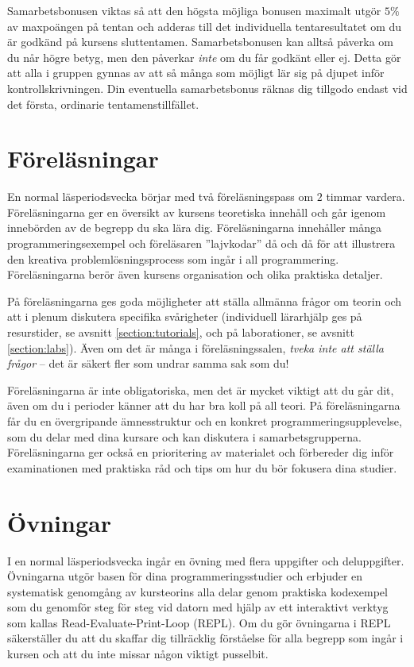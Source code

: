 Samarbetsbonusen viktas så att den högsta möjliga bonusen maximalt utgör $5\%$ av maxpoängen på tentan och adderas till det individuella tentaresultatet om du är godkänd på kursens sluttentamen. Samarbetsbonusen kan alltså påverka om du når högre betyg, men den påverkar \emph{inte} om du får godkänt eller ej. Detta gör att alla i gruppen gynnas av att så många som möjligt lär sig på djupet inför kontrollskrivningen. Din eventuella samarbetsbonus räknas dig tillgodo endast vid det första, ordinarie tentamenstillfället.

\section{Föreläsningar}

En normal läsperiodsvecka börjar med två föreläsningspass om $2$ timmar vardera. Föreläsningarna ger en översikt av kursens teoretiska innehåll och går igenom innebörden av de begrepp du ska lära dig. Föreläsningarna innehåller många programmeringsexempel och föreläsaren ''lajvkodar'' då och då för att illustrera den kreativa problemlösningsprocess som ingår i all programmering. Föreläsningarna berör även kursens organisation och olika praktiska detaljer.

På föreläsningarna ges goda möjligheter att ställa allmänna frågor om teorin och att i plenum diskutera specifika svårigheter (individuell lärarhjälp ges på resurstider, se avsnitt \ref{section:tutorials}, och på laborationer, se avsnitt \ref{section:labs}). Även om det är många i föreläsningssalen, \emph{tveka inte att ställa frågor} -- det är säkert fler som undrar samma sak som du!

Föreläsningarna är inte obligatoriska, men det är mycket viktigt att du går dit, även om du i perioder känner att du har bra koll på all teori. På föreläsningarna får du en övergripande ämnesstruktur och en konkret programmeringsupplevelse, som du delar med dina kursare och kan diskutera i samarbetsgrupperna. Föreläsningarna ger också en prioritering av materialet och förbereder dig inför examinationen med praktiska råd och tips om hur du bör fokusera dina studier.

\section{Övningar}

I en normal läsperiodsvecka ingår en övning med flera uppgifter och deluppgifter.
Övningarna utgör basen för dina programmeringsstudier och erbjuder en systematisk genomgång av kursteorins alla delar genom praktiska kodexempel som du genomför steg för steg vid datorn med hjälp av ett interaktivt verktyg som kallas Read-Evaluate-Print-Loop (REPL). Om du gör övningarna i REPL säkerställer du att du skaffar dig tillräcklig förståelse för alla begrepp som ingår i kursen och att du inte missar någon viktigt pusselbit.

